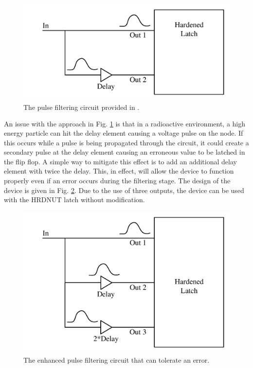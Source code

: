 \begin{figure}[!htbp]
	\centering
	\includegraphics[width=0.65\linewidth]{Figures/PulseFilter}
	\caption{The pulse filtering circuit provided in \cite{FERST}.}
	\label{P_filter}
\end{figure}

An issue with the approach in Fig. \ref{P_filter} is that in a radioactive environment, a high energy particle can hit the delay element causing a voltage pulse on the node. If this occurs while a pulse is being propagated through the circuit, it could create a secondary pulse at the delay element causing an erroneous value to be latched in the flip flop. A simple way to mitigate this effect is to add an additional delay element with twice the delay. This, in effect, will allow the device to function properly even if an error occurs during the filtering stage. The design of the device is given in Fig. \ref{Enh_filter}. Due to the use of three outputs, the device can be used with the HRDNUT latch without modification.

\begin{figure}[!htbp]
	\centering
	\includegraphics[width=0.65\linewidth]{Figures/PulseFilterEnh}
	\caption{The enhanced pulse filtering circuit that can tolerate an error.}
	\label{Enh_filter}
\end{figure} 


